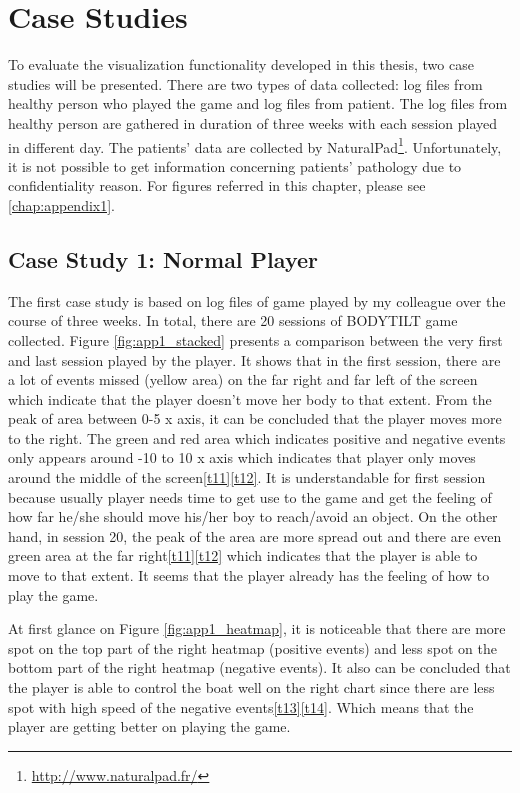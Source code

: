 \chapter{Case Studies}
To evaluate the visualization functionality developed in this thesis, two case studies will be presented. There are two types of data collected: log files from healthy person who played the game and log files from patient. The log files from healthy person are gathered in duration of three weeks with each session played in different day. The patients' data are collected by NaturalPad\footnote{\url{http://www.naturalpad.fr/}}. Unfortunately, it is not possible to get information concerning patients' pathology due to confidentiality reason. For figures referred in this chapter, please see \ref{chap:appendix1}.

\section{Case Study 1: Normal Player}
The first case study is based on log files of game played by my colleague over the course of three weeks. In total, there are 20 sessions of BODYTILT game collected. Figure \ref{fig:app1_stacked} presents a comparison between the very first and last session played by the player. It shows that in the first session, there are a lot of events missed (yellow area) on the far right and far left of the screen which indicate that the player doesn't move her body to that extent. From the peak of area between 0-5 x axis, it can be concluded that the player moves more to the right. The green and red area which indicates positive and negative events only appears around -10 to 10 x axis which indicates that player only moves around the middle of the screen\ref{t11}\ref{t12}. It is understandable for first session because usually player needs time to get use to the game and get the feeling of how far he/she should move his/her boy to reach/avoid an object. On the other hand, in session 20, the peak of the area are more spread out and there are even green area at the far right\ref{t11}\ref{t12} which indicates that the player is able to move to that extent. It seems that the player already has the feeling of how to play the game.

At first glance on Figure \ref{fig:app1_heatmap}, it is noticeable that there are more spot on the top part of the right heatmap (positive events) and less spot on the bottom part of the right heatmap (negative events). It also can be concluded that the player is able to control the boat well on the right chart since there are less spot with high speed of the negative events\ref{t13}\ref{t14}. Which means that the player are getting better on playing the game. 

